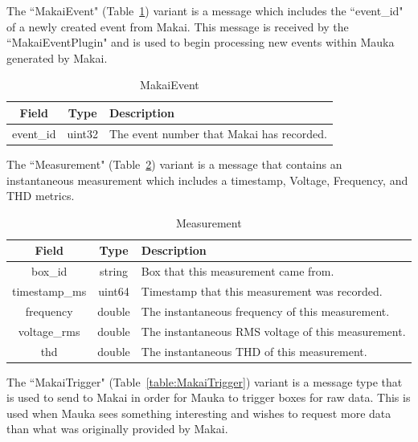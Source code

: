 The ``MakaiEvent" (Table~\ref{table:MakaiEvent}) variant is a message which includes the ``event\_id" of a newly created event from Makai. This message is received by the ``MakaiEventPlugin" and is used to begin processing new events within Mauka generated by Makai.

\begin{table}[H]
	\centering
	\caption{MakaiEvent}
	\begin{tabular}{|c|c|p{8cm}|}
		\hline
		Field & Type & Description  \\
		\hline
		event\_id & uint32 & The event number that Makai has recorded.  \\
		\hline
	\end{tabular}
	\label{table:MakaiEvent}
\end{table}

The ``Measurement" (Table~\ref{table:Measurement}) variant is a message that contains an instantaneous measurement which includes a timestamp, Voltage, Frequency, and THD metrics.

\begin{table}[H]
	\centering
	\caption{Measurement}
	\begin{tabular}{|c|c|p{8cm}|}
		\hline
		Field & Type & Description  \\
		\hline
		box\_id & string  & Box that this measurement came from. \\
		\hline
		timestamp\_ms & uint64 & Timestamp that this measurement was recorded. \\
		\hline
		frequency & double & The instantaneous frequency of this measurement. \\
		\hline
		voltage\_rms & double & The instantaneous RMS voltage of this measurement. \\
		\hline
		thd & double & The instantaneous THD of this measurement. \\
		\hline
	\end{tabular}
	\label{table:Measurement}
\end{table}

The ``MakaiTrigger" (Table~\ref{table:MakaiTrigger}) variant is a message type that is used to send to Makai in order for Mauka to trigger boxes for raw data. This is used when Mauka sees something interesting and wishes to request more data than what was originally provided by Makai.


